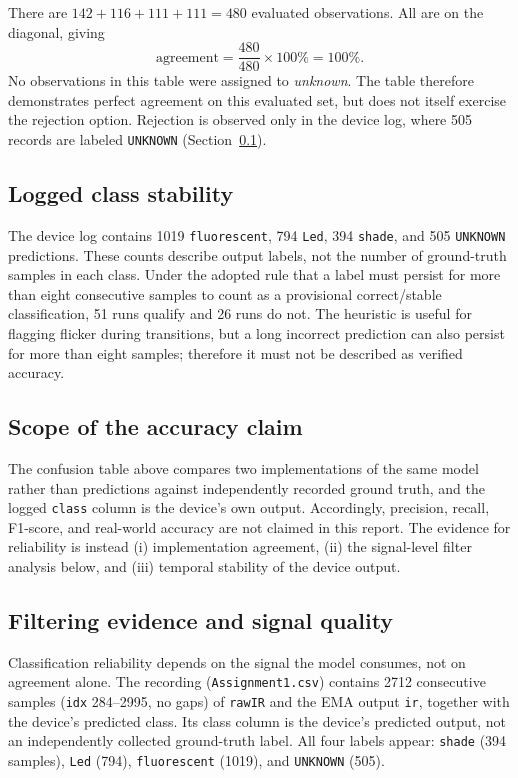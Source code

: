 \documentclass[conference]{IEEEtran}
\begin{document}
There are $142+116+111+111=480$ evaluated observations. All are on the diagonal, giving
\begin{equation}
    \text{agreement} = \frac{480}{480}\times100\%=100\%.
\end{equation}
No observations in this table were assigned to \emph{unknown}. The table therefore demonstrates perfect agreement on this evaluated set, but does not itself exercise the rejection option. Rejection is observed only in the device log, where 505 records are labeled \texttt{UNKNOWN} (Section~\ref{sec:stability}).


\subsection{Logged class stability}
\label{sec:stability}
The device log contains 1019 \texttt{fluorescent}, 794 \texttt{Led}, 394 \texttt{shade}, and 505 \texttt{UNKNOWN} predictions. These counts describe output labels, not the number of ground-truth samples in each class. Under the adopted rule that a label must persist for more than eight consecutive samples to count as a provisional correct/stable classification, 51 runs qualify and 26 runs do not. The heuristic is useful for flagging flicker during transitions, but a long incorrect prediction can also persist for more than eight samples; therefore it must not be described as verified accuracy.

\subsection{Scope of the accuracy claim}
The confusion table above compares two implementations of the same model rather than predictions against independently recorded ground truth, and the logged \texttt{class} column is the device's own output. Accordingly, precision, recall, F1-score, and real-world accuracy are not claimed in this report. The evidence for reliability is instead (i) implementation agreement, (ii) the signal-level filter analysis below, and (iii) temporal stability of the device output.

\subsection{Filtering evidence and signal quality}
\label{sec:filter}
Classification reliability depends on the signal the model consumes, not on agreement alone. The recording (\texttt{Assignment1.csv}) contains 2712 consecutive samples (\texttt{idx} 284--2995, no gaps) of \texttt{rawIR} and the EMA output \texttt{ir}, together with the device's predicted class. Its class column is the device's predicted output, not an independently collected ground-truth label. All four labels appear: \texttt{shade} (394 samples), \texttt{Led} (794), \texttt{fluorescent} (1019), and \texttt{UNKNOWN} (505).
\end{document}
